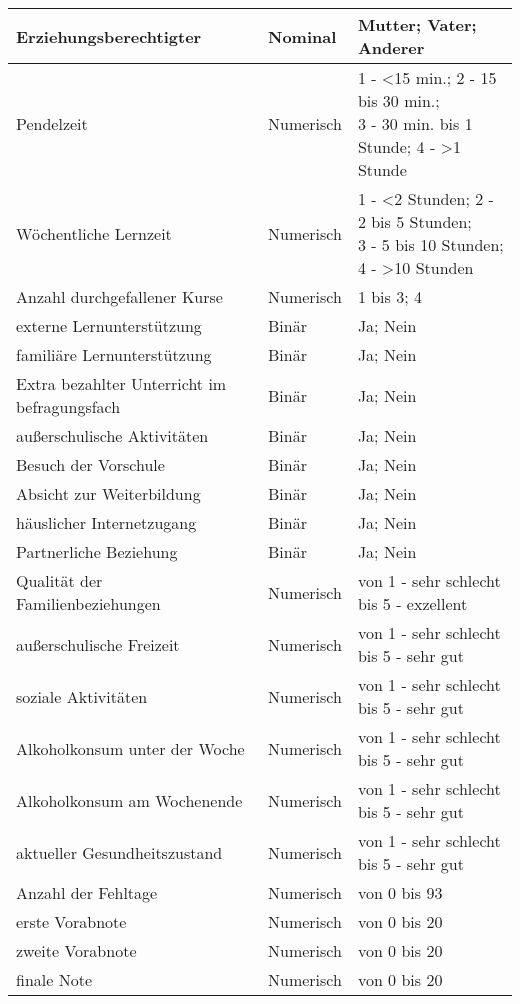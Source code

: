\begin{table}[!ht]
\begin{tabular}{lll}
        Erziehungsberechtigter & Nominal & Mutter; Vater; Anderer \\  \hline
        Pendelzeit & Numerisch & \makecell[l]{1 - <15 min.; 2 - 15 bis 30 min.; \\3 - 30 min. bis 1 Stunde; 4 - >1 Stunde} \\  \hline
        Wöchentliche Lernzeit & Numerisch & \makecell[l]{1 - <2 Stunden; 2 - 2 bis 5 Stunden; \\3 - 5 bis 10 Stunden; 4 - >10 Stunden }\\  \hline
        Anzahl durchgefallener Kurse & Numerisch & 1 bis 3; 4 \\  \hline
        externe Lernunterstützung & Binär & Ja; Nein \\  \hline
        familiäre Lernunterstützung & Binär & Ja; Nein \\  \hline
        Extra bezahlter Unterricht im befragungsfach & Binär & Ja; Nein \\  \hline
        außerschulische Aktivitäten & Binär & Ja; Nein \\  \hline
        Besuch der Vorschule & Binär & Ja; Nein \\  \hline
        Absicht zur Weiterbildung & Binär & Ja; Nein \\ \hline
        häuslicher Internetzugang & Binär & Ja; Nein \\ \hline
        Partnerliche Beziehung & Binär & Ja; Nein \\ \hline
        Qualität der Familienbeziehungen & Numerisch & von 1 - sehr schlecht bis 5 - exzellent\\ \hline
        außerschulische Freizeit & Numerisch & von 1 - sehr schlecht bis 5 - sehr gut \\ \hline
        soziale Aktivitäten & Numerisch & von 1 - sehr schlecht bis 5 - sehr gut \\ \hline
        Alkoholkonsum unter der Woche & Numerisch & von 1 - sehr schlecht bis 5 - sehr gut \\ \hline
        Alkoholkonsum am Wochenende & Numerisch & von 1 - sehr schlecht bis 5 - sehr gut \\ \hline
        aktueller Gesundheitszustand & Numerisch & von 1 - sehr schlecht bis 5 - sehr gut\\ \hline
        Anzahl der Fehltage & Numerisch & von 0 bis 93 \\ \hline
        erste Vorabnote & Numerisch & von 0 bis 20 \\ \hline
        zweite Vorabnote & Numerisch & von 0 bis 20 \\ \hline
        finale Note & Numerisch & von 0 bis 20 \\ \hline
    \hline
    \end{tabular}
\end{table}

